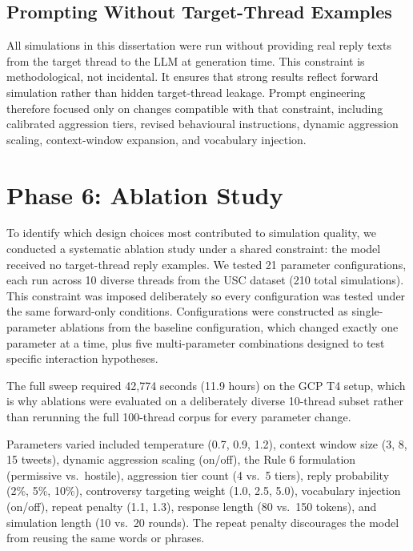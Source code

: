 \documentclass[logo,bsc,singlespacing,parskip,online]{infthesis}
\begin{document}
\subsection{Prompting Without Target-Thread Examples}

All simulations in this dissertation were run without providing real reply texts from the target thread to the LLM at generation time. This constraint is methodological, not incidental. It ensures that strong results reflect forward simulation rather than hidden target-thread leakage. Prompt engineering therefore focused only on changes compatible with that constraint, including calibrated aggression tiers, revised behavioural instructions, dynamic aggression scaling, context-window expansion, and vocabulary injection.

\section{Phase 6: Ablation Study}

To identify which design choices most contributed to simulation quality, we conducted a systematic ablation study under a shared constraint: the model received no target-thread reply examples. We tested 21 parameter configurations, each run across 10 diverse threads from the USC dataset (210 total simulations). This constraint was imposed deliberately so every configuration was tested under the same forward-only conditions. Configurations were constructed as single-parameter ablations from the baseline configuration, which changed exactly one parameter at a time, plus five multi-parameter combinations designed to test specific interaction hypotheses.

The full sweep required 42,774 seconds (11.9 hours) on the GCP T4 setup, which is why ablations were evaluated on a deliberately diverse 10-thread subset rather than rerunning the full 100-thread corpus for every parameter change.

Parameters varied included temperature (0.7, 0.9, 1.2), context window size (3, 8, 15 tweets), dynamic aggression scaling (on/off), the Rule 6 formulation (permissive vs.\ hostile), aggression tier count (4 vs.\ 5 tiers), reply probability (2\%, 5\%, 10\%), controversy targeting weight (1.0, 2.5, 5.0), vocabulary injection (on/off), repeat penalty (1.1, 1.3), response length (80 vs.\ 150 tokens), and simulation length (10 vs.\ 20 rounds). The repeat penalty discourages the model from reusing the same words or phrases.
\end{document}
